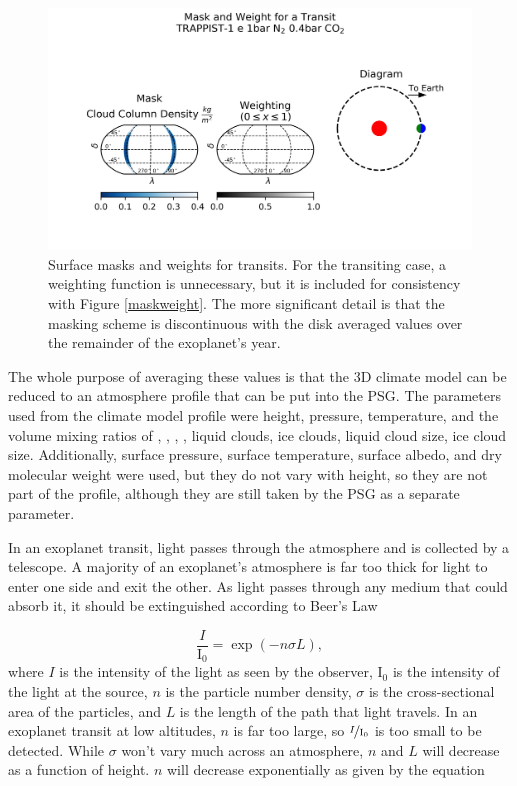 \begin{figure}[ht]
    \includegraphics[width=\textwidth]{methods/transit_weights.png}
    \caption[Surface Mask and Weights for Transits]{Surface masks and weights
    for transits. For the transiting case, a weighting function is unnecessary,
    but it is included for consistency with Figure \ref{maskweight}. The more
    significant detail is that the masking scheme is discontinuous with the disk
    averaged values over the remainder of the exoplanet's year.}
    \label{transitweight}
\end{figure}

The whole purpose of averaging these values is that the 3D climate model can be
 reduced to an atmosphere profile that can be put into the PSG. The parameters
 used from the climate model profile were height, pressure, temperature, and the
 volume mixing ratios of , , , ,
 liquid clouds, ice clouds, liquid cloud size, ice cloud size. Additionally,
 surface pressure, surface temperature, surface albedo, and dry molecular weight
 were used, but they do not vary with height, so they are not part of the
 profile, although they are still taken by the PSG as a separate parameter.

In an exoplanet transit, light passes through the atmosphere and is collected
 by a telescope. A majority of an exoplanet's atmosphere is far too thick for
 light to enter one side and exit the other. As light passes through any
 medium that could absorb it, it should be extinguished according to Beer's Law

\begin{equation}
    \frac{I}{\mathrm{I_0}}=\exp(-n \sigma L),
\end{equation}
where $I$ is the intensity of the light as seen by the observer, $\mathrm{I_0}$
 is the intensity of the light at the source, $n$ is the particle number
 density, $\sigma$ is the cross-sectional area of the particles, and $L$ is the
 length of the path that light travels. In an exoplanet transit at low
 altitudes, $n$ is far too large, so $\nicefrac{I}{\mathrm{I_0}}$ is too small to
 be detected. While $\sigma$ won't vary much across an atmosphere, $n$ and $L$
 will decrease as a function of height. $n$ will decrease
 exponentially as given by the equation

